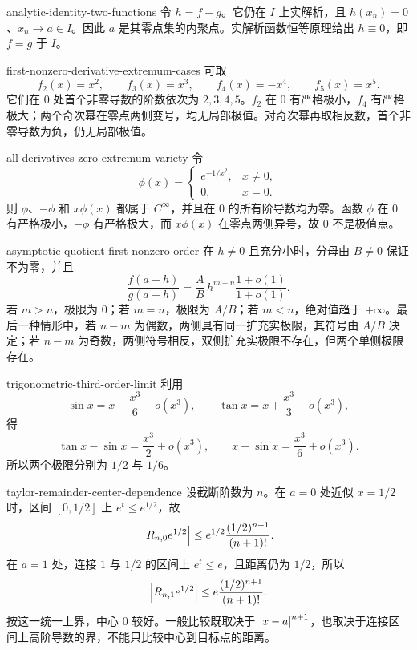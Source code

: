 \begin{solution}{analytic-identity-two-functions}
令 \(h=f-g\)。它仍在 \(I\) 上实解析，且 \(h(x_n)=0\)、\(x_n\to a\in I\)。因此 \(a\) 是其零点集的内聚点。实解析函数恒等原理给出 \(h\equiv0\)，即 \(f=g\) 于 \(I\)。
\end{solution}

\begin{solution}{first-nonzero-derivative-extremum-cases}
可取
\[
 f_2(x)=x^2,\qquad f_3(x)=x^3,\qquad
 f_4(x)=-x^4,\qquad f_5(x)=x^5.
\]
它们在 \(0\) 处首个非零导数的阶数依次为 \(2,3,4,5\)。\(f_2\) 在
\(0\) 有严格极小，\(f_4\) 有严格极大；两个奇次幂在零点两侧变号，均无局部极值。对奇次幂再取相反数，首个非零导数为负，仍无局部极值。
\end{solution}

\begin{solution}{all-derivatives-zero-extremum-variety}
令
\[
 \phi(x)=
 \begin{cases}e^{-1/x^2},&x\ne0,\\0,&x=0.\end{cases}
\]
则 \(\phi\)、\(-\phi\) 和 \(x\phi(x)\) 都属于 \(C^\infty\)，并且在 \(0\) 的所有阶导数均为零。函数 \(\phi\) 在 \(0\) 有严格极小，\(-\phi\) 有严格极大，而 \(x\phi(x)\) 在零点两侧异号，故 \(0\) 不是极值点。
\end{solution}

\begin{solution}{asymptotic-quotient-first-nonzero-order}
在 \(h\ne0\) 且充分小时，分母由 \(B\ne0\) 保证不为零，并且
\[
 \frac{f(a+h)}{g(a+h)}
 =\frac AB\,h^{m-n}\frac{1+o(1)}{1+o(1)}.
\]
若 \(m>n\)，极限为 \(0\)；若 \(m=n\)，极限为 \(A/B\)；若
\(m<n\)，绝对值趋于 \(+\infty\)。最后一种情形中，若 \(n-m\) 为偶数，两侧具有同一扩充实极限，其符号由 \(A/B\) 决定；若 \(n-m\) 为奇数，两侧符号相反，双侧扩充实极限不存在，但两个单侧极限存在。
\end{solution}

\begin{solution}{trigonometric-third-order-limit}
利用
\[
 \sin x=x-\frac{x^3}{6}+o(x^3),\qquad
 \tan x=x+\frac{x^3}{3}+o(x^3),
\]
得
\[
 \tan x-\sin x=\frac{x^3}{2}+o(x^3),\qquad
 x-\sin x=\frac{x^3}{6}+o(x^3).
\]
所以两个极限分别为 \(1/2\) 与 \(1/6\)。
\end{solution}

\begin{solution}{taylor-remainder-center-dependence}
设截断阶数为 \(n\)。在 \(a=0\) 处近似 \(x=1/2\) 时，区间
\([0,1/2]\) 上 \(e^t\le e^{1/2}\)，故
\[
 \left|R_{n,0}e^{1/2}\right|
 \le e^{1/2}\frac{(1/2)^{n+1}}{(n+1)!}.
\]
在 \(a=1\) 处，连接 \(1\) 与 \(1/2\) 的区间上 \(e^t\le e\)，且距离仍为
\(1/2\)，所以
\[
 \left|R_{n,1}e^{1/2}\right|
 \le e\frac{(1/2)^{n+1}}{(n+1)!}.
\]
按这一统一上界，中心 \(0\) 较好。一般比较既取决于 \(\left|x-a\right|^{n+1}\)，也取决于连接区间上高阶导数的界，不能只比较中心到目标点的距离。
\end{solution}

